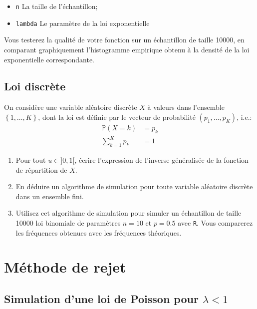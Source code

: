 \documentclass[]{article}
\providecommand{\tightlist}{%
  \setlength{\itemsep}{0pt}\setlength{\parskip}{0pt}}
\begin{document}
\begin{itemize}
\tightlist
\item
  \texttt{n} La taille de l'échantillon;
\item
  \texttt{lambda} Le paramètre de la loi exponentielle
\end{itemize}

Vous testerez la qualité de votre fonction sur un échantillon de taille
10000, en comparant graphiquement l'histogramme empirique obtenu à la
densité de la loi exponentielle correspondante.

\hypertarget{loi-discruxe8te}{%
\subsection{Loi discrète}\label{loi-discruxe8te}}

\label{exo:inv:disc} On considère une variable aléatoire discrète \(X\)
à valeurs dans l'ensemble \(\left\lbrace 1,\dots, K\right\rbrace\), dont
la loi est définie par le vecteur de probabilité \((p_1, \dots, p_K)\),
i.e.: \begin{align}
\mathbb{P}(X = k) &= p_k\\
\sum_{k = 1}^K p_k &= 1
\end{align}

\begin{enumerate}
\def\labelenumi{\arabic{enumi}.}
\item
  Pour tout \(u \in ]0, 1[\), écrire l'expression de l'inverse
  généralisée de la fonction de répartition de \(X\).
\item
  En déduire un algorithme de simulation pour toute variable aléatoire
  discrète dans un ensemble fini.
\item
  Utilisez cet algorithme de simulation pour simuler un échantillon de
  taille 10000 loi binomiale de paramètres \(n = 10\) et \(p = 0.5\)
  avec \texttt{R}. Vous comparerez les fréquences obtenues avec les
  fréquences théoriques.
\end{enumerate}

\hypertarget{muxe9thode-de-rejet}{%
\section{Méthode de rejet}\label{muxe9thode-de-rejet}}

\hypertarget{simulation-dune-loi-de-poisson-pour-lambda-1}{%
\subsection{\texorpdfstring{Simulation d'une loi de Poisson pour
\(\lambda < 1\)}{Simulation d'une loi de Poisson pour \textbackslash{}lambda \textless{} 1}}\label{simulation-dune-loi-de-poisson-pour-lambda-1}}
\end{document}
